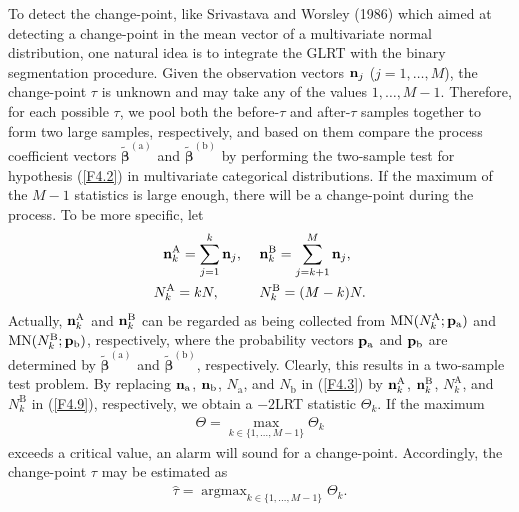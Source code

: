 To detect the change-point, like Srivastava and Worsley (1986) which aimed at
detecting a change-point in the mean vector of a multivariate normal distribution,
one natural idea is to integrate the GLRT with the binary segmentation procedure.
Given the observation vectors ${\bf n}_j$ ($j=1,\ldots,M$), the change-point $\tau$
is unknown and may take any of the values $1,\ldots,M-1$. Therefore, for each
possible $\tau$, we pool both the before-$\tau$ and after-$\tau$ samples together to
form two large samples, respectively, and based on them compare the process
coefficient vectors $\widetilde{\bm{\beta}}^{(\mathrm{a})}$ and
$\widetilde{\bm{\beta}}^{(\mathrm{b})}$ by performing the two-sample test for
hypothesis (\ref{F4.2}) in multivariate categorical distributions. If the maximum of
the $M-1$ statistics is large enough, there will be a change-point during the
process. To be more specific, let
\begin{align}\label{F4.9}
{\bf n}^{\mathrm{A}}_k=\sum_{j=1}^k{\bf n}_j,\quad\ &
{\bf n}^{\mathrm{B}}_k=\sum_{j=k+1}^M{\bf n}_j,\nonumber\\
N^{\mathrm{A}}_k=kN,\quad\quad\quad & N^{\mathrm{B}}_k=(M-k)N.
\end{align}
Actually, ${\bf n}^{\mathrm{A}}_k$ and ${\bf n}^{\mathrm{B}}_k$ can be regarded as
being collected from $\mbox{MN}(N^{\mathrm{A}}_k;{\bf p}_{\mathrm{a}})$ and
$\mbox{MN}(N^{\mathrm{B}}_k;{\bf p}_{\mathrm{b}})$, respectively, where the
probability vectors ${\bf p}_{\mathrm{a}}$ and ${\bf p}_{\mathrm{b}}$ are determined
by $\widetilde{\bm{\beta}}^{(\mathrm{a})}$ and
$\widetilde{\bm{\beta}}^{(\mathrm{b})}$, respectively. Clearly, this results in a
two-sample test problem. By replacing ${\bf n}_{\mathrm{a}}$, ${\bf
n}_{\mathrm{b}}$, $N_{\mathrm{a}}$, and $N_{\mathrm{b}}$ in (\ref{F4.3}) by ${\bf
n}^{\mathrm{A}}_k$, ${\bf n}^{\mathrm{B}}_k$, $N^{\mathrm{A}}_k$, and
$N^{\mathrm{B}}_k$ in (\ref{F4.9}), respectively, we obtain a $-2$LRT statistic
$\Theta_k$. If the maximum
\begin{align*}
\Theta=\max_{k\in\{1,\ldots,M-1\}}\Theta_k
\end{align*}
exceeds a critical value, an alarm will sound for a change-point. Accordingly, the
change-point $\tau$ may be estimated as
\begin{align}
\hat{\tau}=\mathop{\arg\max}_{k\in\{1,\ldots,M-1\}}\Theta_k.\label{F4.10}
\end{align}

